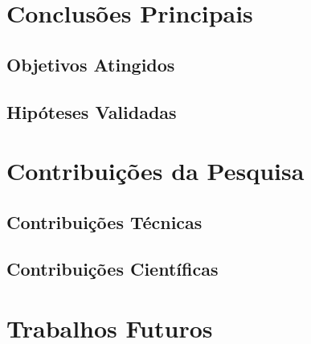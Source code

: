 
\section{Conclusões Principais}


\subsection{Objetivos Atingidos}


\subsection{Hipóteses Validadas}


\section{Contribuições da Pesquisa}


\subsection{Contribuições Técnicas}


\subsection{Contribuições Científicas}


\section{Trabalhos Futuros}


